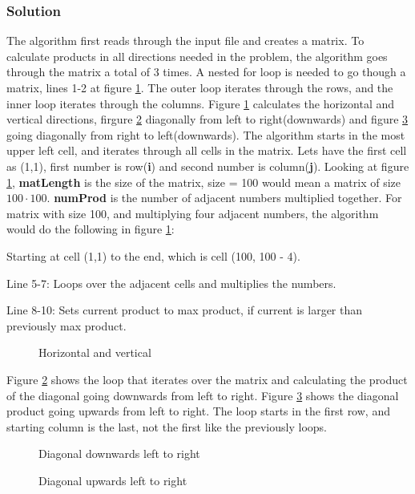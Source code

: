\documentclass[a4paper, 11pt, titlepage]{article}
\begin{document}
\subsubsection{Solution}
The algorithm first reads through the input file and creates a matrix. To calculate products in all directions needed in the problem, the algorithm goes through the matrix a total of 3 times. A nested for loop is needed to go though a matrix, lines 1-2 at figure \ref{111}. The outer loop iterates through the rows, and the inner loop iterates through the columns. Figure \ref{111} calculates the horizontal and vertical directions, firgure \ref{112} diagonally from left to right(downwards) and figure \ref{113} going diagonally from right to left(downwards). The algorithm starts in the most upper left cell, and iterates through all cells in the matrix. Lets have the first cell as (1,1), first number is row(\textbf{i}) and second number is column(\textbf{j}). Looking at figure \ref{111}, \textbf{matLength} is the size of the matrix, size = 100 would mean a matrix of size $100 \cdot 100$. \textbf{numProd} is the number of adjacent numbers multiplied together. For matrix with size 100, and multiplying four adjacent numbers, the algorithm would do the following in figure \ref{111}: 
\begin{list}{}{}
	\item Starting at cell (1,1) to the end, which is cell (100, 100 - 4).
	\item Line 5-7: Loops over the adjacent cells and multiplies the numbers.
	\item Line 8-10: Sets current product to max product, if current is larger than previously max product.
\end{list}
\begin{figure}[H]
	\begin{center}
		
		\caption{Horizontal and vertical}
		\label{111}
	\end{center}
\end{figure}
Figure \ref{112} shows the loop that iterates over the matrix and calculating the product of the diagonal going downwards from left to right. Figure \ref{113} shows the diagonal product going upwards from left to right. The loop starts in the first row, and starting column is the last, not the first like the previously loops.
\begin{figure}[H]
	\begin{center}
		
		\caption{Diagonal downwards left to right}
		\label{112}
	\end{center}
\end{figure}
\begin{figure}[H]
	\begin{center}
		
		\caption{Diagonal upwards left to right}
		\label{113}
	\end{center}
\end{figure}
\end{document}
